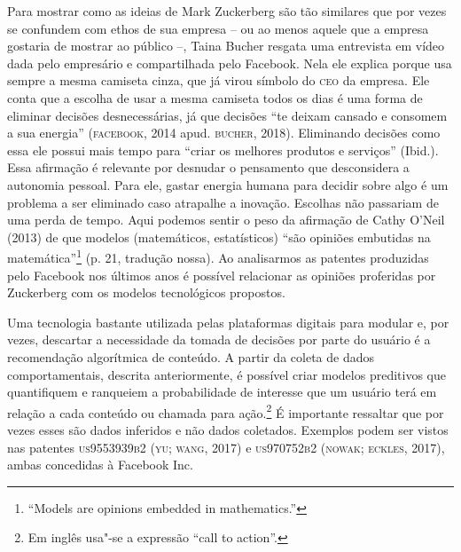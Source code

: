 \noindent{}Para mostrar como as ideias de Mark Zuckerberg são tão similares que por
vezes se confundem com ethos de sua empresa -- ou ao menos aquele que a
empresa gostaria de mostrar ao público --, Taina Bucher resgata uma
entrevista em vídeo dada pelo empresário e compartilhada pelo Facebook.
Nela ele explica porque usa sempre a mesma camiseta cinza, que já virou
símbolo do \textsc{ceo} da empresa. Ele conta que a escolha de usar a mesma
camiseta todos os dias é uma forma de eliminar decisões desnecessárias,
já que decisões ``te deixam cansado e consomem a sua energia''
(\textsc{facebook}, 2014 apud. \textsc{bucher}, 2018). Eliminando decisões como essa ele
possui mais tempo para ``criar os melhores produtos e serviços''
(Ibid.). Essa afirmação é relevante por desnudar o pensamento que
desconsidera a autonomia pessoal. Para ele, gastar energia humana para
decidir sobre algo é um problema a ser eliminado caso atrapalhe a
inovação. Escolhas não passariam de uma perda de tempo. Aqui podemos
sentir o peso da afirmação de Cathy O'Neil (2013) de que modelos
(matemáticos, estatísticos) ``são opiniões embutidas na
matemática''\footnote{``Models are opinions embedded in mathematics.''}
(p. 21, tradução nossa). Ao analisarmos as patentes produzidas pelo
Facebook nos últimos anos é possível relacionar as opiniões proferidas
por Zuckerberg com os modelos tecnológicos propostos.

Uma tecnologia bastante utilizada pelas plataformas digitais para
modular e, por vezes, descartar a necessidade da tomada de decisões por
parte do usuário é a recomendação algorítmica de conteúdo. A partir da
coleta de dados comportamentais, descrita anteriormente, é possível
criar modelos preditivos que quantifiquem e ranqueiem a probabilidade de
interesse que um usuário terá em relação a cada conteúdo ou chamada para
ação.\footnote{Em inglês usa"-se a expressão ``call to action''.} É
importante ressaltar que por vezes esses são dados inferidos e não dados
coletados. Exemplos podem ser vistos nas patentes \textsc{us9553939b2} (\textsc{yu; wang},
2017) e \textsc{us970752b2} (\textsc{nowak; eckles}, 2017), ambas concedidas à Facebook
Inc.

